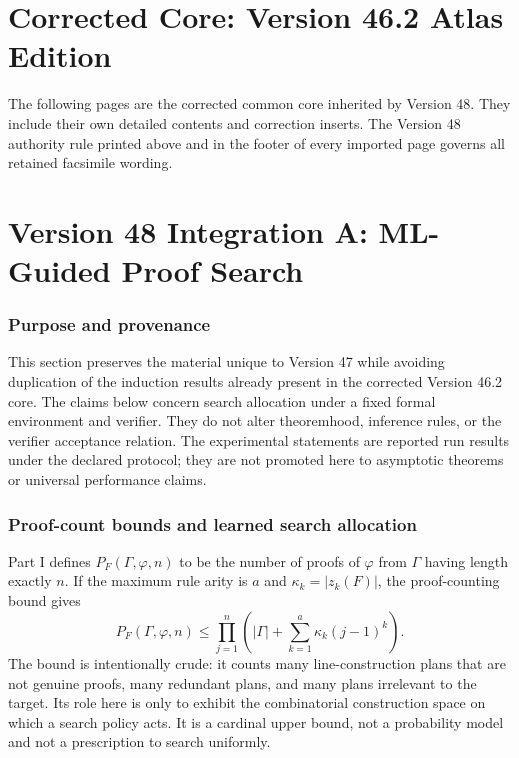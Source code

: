 \documentclass[11pt]{article}
\theoremstyle{remark}
\newcommand{\coreoverlay}{%
  \thispagestyle{empty}%
  \begin{tikzpicture}[remember picture,overlay]
    \fill[white] (current page.north west) rectangle ([yshift=-0.56in]current page.north east);
    \draw[line width=0.35pt] ([xshift=0.55in,yshift=-0.51in]current page.north west) -- ([xshift=-0.55in,yshift=-0.51in]current page.north east);
    \node[anchor=north west,font=\scriptsize] at ([xshift=0.55in,yshift=-0.16in]current page.north west)
      {Depths of Induction and Formalized Self-Awareness};
    \node[anchor=north east,font=\scriptsize] at ([xshift=-0.55in,yshift=-0.16in]current page.north east)
      {Version 48 consolidated core};
    \node[anchor=south,font=\tiny,text=gray!80!black] at ([yshift=0.13in]current page.south)
      {Documentary core: if retained facsimile wording conflicts with an adjacent correction insert, the correction insert alone states the Version 48 claim.};
  \end{tikzpicture}%
}
\begin{document}
\tableofcontents
\clearpage

\part*{Corrected Core: Version 46.2 Atlas Edition}
\noindent The following pages are the corrected common core inherited by Version 48. They include their own detailed contents and correction inserts. The Version 48 authority rule printed above and in the footer of every imported page governs all retained facsimile wording.
\medskip



\clearpage
\part*{Version 48 Integration A: ML-Guided Proof Search}
\setcounter{section}{0}
\section*{Purpose and provenance}
This section preserves the material unique to Version 47 while avoiding duplication of the induction results already present in the corrected Version 46.2 core. The claims below concern search allocation under a fixed formal environment and verifier. They do not alter theoremhood, inference rules, or the verifier acceptance relation. The experimental statements are reported run results under the declared protocol; they are not promoted here to asymptotic theorems or universal performance claims.

\section{Proof-count bounds and learned search allocation}
Part I defines $P_F(\Gamma,\varphi,n)$ to be the number of proofs of $\varphi$ from $\Gamma$ having length exactly $n$. If the maximum rule arity is $a$ and $\kappa_k=|z_k(F)|$, the proof-counting bound gives
\[
P_F(\Gamma,\varphi,n)
\le
\prod_{j=1}^{n}
\left(
|\Gamma|+\sum_{k=1}^{a}\kappa_k(j-1)^k
\right).
\]
The bound is intentionally crude: it counts many line-construction plans that are not genuine proofs, many redundant plans, and many plans irrelevant to the target. Its role here is only to exhibit the combinatorial construction space on which a search policy acts. It is a cardinal upper bound, not a probability model and not a prescription to search uniformly.
\end{document}
